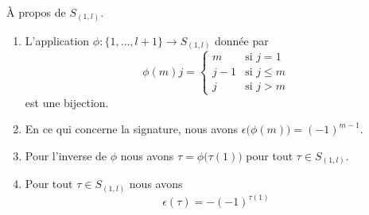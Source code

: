 \begin{lemma}		\label{LEMooDBIEooYcjlDP}
	À propos de \( S_{(1,l)}\).
	\begin{enumerate}
		\item
		      L'application \(\phi \colon \{ 1,\ldots,l+1 \}\to S_{(1,l)}  \) donnée par
		      \begin{equation}		\label{EQooRALSooPWvZPd}
			      \phi(m)j=\begin{cases}
				      m   & \text{si } j=1    \\
				      j-1 & \text{si }j\leq m \\
				      j   & \text{si }j>m
			      \end{cases}
		      \end{equation}
		      est une bijection.
		\item		\label{ITEMooRIHAooItlkCh}
		      En ce qui concerne la signature, nous avons \( \epsilon\big( \phi(m) \big)=(-1)^{m-1}\).
		\item		\label{ITEMooCOPZooLiUPWE}
		      Pour l'inverse de \( \phi\) nous avons \( \tau=\phi\big( \tau(1) \big)\) pour tout \( \tau\in S_{(1,l)}\).
		\item  \label{ITEMooHMNFooENphGK}
		      Pour tout \( \tau\in S_{(1,l)}\) nous avons
		      \begin{equation}
			      \epsilon(\tau)=-(-1)^{\tau(1)}
		      \end{equation}
	\end{enumerate}
\end{lemma}

